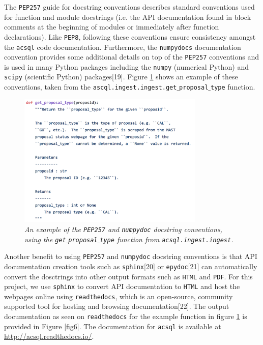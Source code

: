 \documentclass[10pt,journal,compsoc]{IEEEtran}
\begin{document}
The \texttt{PEP257} guide for docstring conventions describes standard conventions used for function and module docstrings (i.e. the API documentation found in block comments at the
beginning of modules or immediately after function declarations).  Like \texttt{PEP8}, following these conventions ensure consistency amongst the \texttt{acsql} code documentation.
Furthermore, the \texttt{numpydocs} documentation convention provides some additional details on top of the \texttt{PEP257} conventions and is used in many Python packages including
the \texttt{numpy} (numerical Python) and \texttt{scipy} (scientific Python) packages[19].  Figure \ref{fig5} shows an example of these conventions, taken from the
\texttt{ascql.ingest.ingest.get$\_$proposal$\_$type} function.

\begin{figure}[!b]
\centering
\includegraphics[width=3.5in]{./figures/docstrings.png}
\caption{\textit{An example of the \texttt{PEP257} and \texttt{numpydoc} docstring conventions, using the \texttt{get$\_$proposal$\_$type} function from \texttt{acsql.ingest.ingest}.}}
\label{fig5}
\end{figure}

Another benefit to using \texttt{PEP257} and \texttt{numpydoc} docstring conventions is that API documentation creation tools such as \texttt{sphinx}[20] or \texttt{epydoc}[21] can
automatically convert the dosctrings into other output formats such as \texttt{HTML} and \texttt{PDF}.  For this project, we use \texttt{sphinx} to convert API documentation to \texttt{HTML}
and host the webpages online using \texttt{readthedocs}, which is an open-source, community supported tool for hosting and browsing documentation[22]. The output documentation as seen on
\texttt{readthedocs} for the example function in figure \ref{fig5} is provided in Figure \ref{fig6}. The documentation for \texttt{acsql} is available at
\textcolor{blue}{\url{http://acsql.readthedocs.io/}}.
\end{document}
